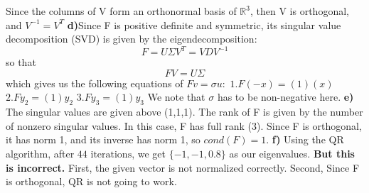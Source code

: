 \documentclass[12pt,letterpaper]{article}
\begin{document}
Since the columns of V form an orthonormal basis of $\mathbb{R}^3$, then V is orthogonal, and $V^{-1}=V^T$
\newline 
\newline 
\textbf{d)}Since F is positive definite and symmetric, its singular value decomposition (SVD) is given by the eigendecomposition:
$$ F = U \Sigma V^T =VDV^{-1}$$
so that
$$ F V = U \Sigma $$
which gives us the following equations of $F v = \sigma u:$
\newline $ 1. F (-x) = (1) (x) $
\newline $ 2. F y_2 =  (1)y_2 $
\newline $3. F y_3 =(1) y_3  $
\newline We note that $\sigma$ has to be non-negative here.
\newline \newline \textbf{e)} The singular values are given above (1,1,1). The rank of F is given by the number of nonzero singular values. In this case, F has full rank (3). Since F is orthogonal, it has norm 1, and its inverse has norm 1, so $cond(F)=1$.
\newline
\newline \textbf{f)} Using the QR algorithm, after $\boxed{44 \text{ iterations}}$, we get $\{ -1,-1,0.8 \}$ as our eigenvalues. \textbf{But this is incorrect.} First, the given vector is not normalized correctly. Second, Since F is orthogonal, QR is not going to work.



\vspace{1cm}
\end{document}
